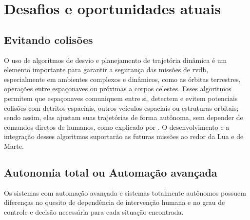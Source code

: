 \section{Desafios e oportunidades atuais}

\subsection{Evitando colisões}

O uso de algoritmos de desvio e planejamento de trajetória dinâmica é um elemento importante para garantir a segurança das missões de \gls{rvdb}, especialmente em ambientes complexos e dinâmicos, como as órbitas terrestres, operações entre espaçonaves ou próximas a corpos celestes.
Esses algoritmos permitem que espaçonaves comuniquem entre si, detectem e evitem potenciais colisões com detritos espaciais, outros veículos espaciais ou estruturas orbitais; sendo assim, elas ajustam suas trajetórias de forma autônoma, sem depender de comandos diretos de humanos, como explicado por \cite{newman2024}.
O desenvolvimento e a integração desses algoritmos suportarão as futuras missões ao redor da Lua e de Marte.

\subsection{Autonomia total ou Automação avançada}

Os sistemas com automação avançada e sistemas totalmente autônomos possuem diferenças no quesito de dependência de intervenção humana e no grau de controle e decisão necessária para cada situação encontrada.




